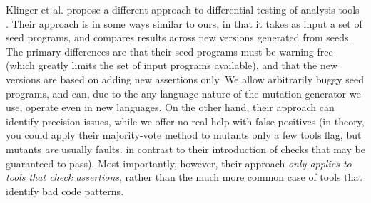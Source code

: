 Klinger et al. propose a different approach to differential testing of analysis tools \cite{klinger2019differentially}.  Their approach is in some ways similar to ours, in that it takes as input a set of seed programs, and compares results across new versions generated from seeds.  The primary differences are that their seed programs must be warning-free (which greatly limits the set of input programs available), and that the new versions are based on adding new assertions only.  We allow arbitrarily buggy seed programs, and can, due to the any-language nature of the mutation generator we use, operate even in new languages.  On the other hand, their approach can identify precision issues, while we offer no real help with false positives (in theory, you could apply their majority-vote method to mutants only a few tools flag, but mutants \emph{are} usually faults. in contrast to their introduction of checks that may be guaranteed to pass).  Most importantly, however, their approach \emph{only applies to tools that check assertions}, rather than the much more common case of tools that identify bad code patterns.